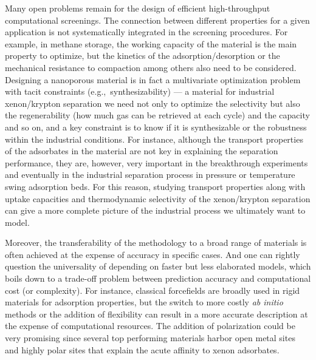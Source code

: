\documentclass[main.tex]{subfiles}
\begin{document}
Many open problems remain for the design of efficient high-throughput computational screenings. The connection between different properties for a given application is not systematically integrated in the screening procedures. For example, in methane storage, the working capacity of the material is the main property to optimize, but the kinetics of the adsorption/desorption or the mechanical resistance to compaction among others also need to be considered. Designing a nanoporous material is in fact a multivariate optimization problem with tacit constraints (e.g.,\ synthesizability) --- a material for industrial xenon/krypton separation we need not only to optimize the selectivity but also the regenerability (how much gas can be retrieved at each cycle) and the capacity and so on, and a key constraint is to know if it is synthesizable or the robustness within the industrial conditions. For instance, although the transport properties of the adsorbates in the material are not key in explaining the separation performance, they are, however, very important in the breakthrough experiments and eventually in the industrial separation process in pressure or temperature swing adsorption beds. For this reason, studying transport properties along with uptake capacities and thermodynamic selectivity of the xenon/krypton separation can give a more complete picture of the industrial process we ultimately want to model. 

Moreover, the transferability of the methodology to a broad range of materials is often achieved at the expense of accuracy in specific cases. And one can rightly question the universality of depending on faster but less elaborated models, which boils down to a trade-off problem between prediction accuracy and computational cost (or complexity). For instance, classical forcefields are broadly used in rigid materials for adsorption properties, but the switch to more costly \emph{ab initio} methods or the addition of flexibility can result in a more accurate description at the expense of computational resources. The addition of polarization could be very promising since several top performing materials harbor open metal sites and highly polar sites that explain the acute affinity to xenon adsorbates. 
\end{document}
